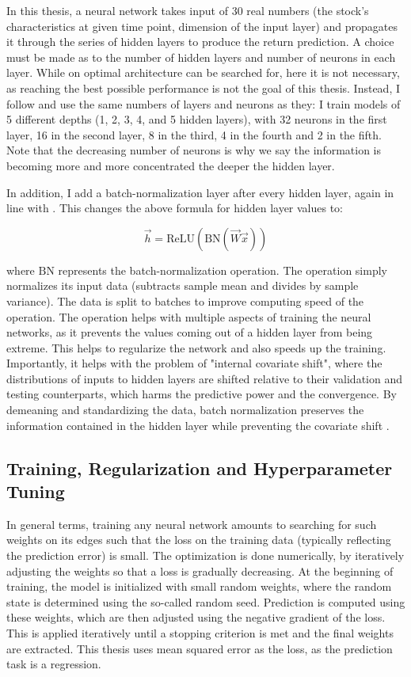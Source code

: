 	In this thesis, a neural network takes input of 30 real numbers (the stock's characteristics at given time point, dimension of the input layer) and propagates it through the series of hidden layers to produce the return prediction.	A choice must be made as to the number of hidden layers and number of neurons in each layer. While on optimal architecture can be searched for, here it is not necessary, as reaching the best possible performance is not the goal of this thesis. Instead, I follow \cite{gu2020empirical} and use the same numbers of layers and neurons as they: I train models of 5 different depths (1, 2, 3, 4, and 5 hidden layers), with 32 neurons in the first layer, 16 in the second layer, 8 in the third, 4 in the fourth and 2 in the fifth. Note that the decreasing number of neurons is why we say the information is becoming more and more concentrated the deeper the hidden layer.
	
	In addition, I add a batch-normalization layer \citep{ioffe2015batch} after every hidden layer, again in line with  \cite{gu2020empirical}. This changes the above formula for hidden layer values to: 
	
	\begin{equation}
		\vec{h} = \text{ReLU}(\text{BN}(\vec{W}\vec{x}))
	\end{equation}
	
	where $\text{BN}$ represents the batch-normalization operation. The operation simply normalizes its input data (subtracts sample mean and divides by sample variance). The data is split to batches to improve computing speed of the operation. The operation helps with multiple aspects of training the neural networks, as it prevents the values coming out of a hidden layer from being extreme. This helps to regularize the network and also speeds up the training. Importantly, it helps with the problem of "internal covariate shift", where the distributions of inputs to hidden layers are shifted relative to their validation and testing counterparts, which harms the predictive power and the convergence. By demeaning and standardizing the data, batch normalization preserves the information contained in the hidden layer while preventing the covariate shift \citep{ioffe2015batch}. 
	
	
	\subsection{Training, Regularization and Hyperparameter Tuning}
	
	In general terms, training any neural network amounts to searching for such weights on its edges such that the loss on the training data (typically reflecting the prediction error) is small. The optimization is done numerically, by iteratively adjusting the weights so that a loss is gradually decreasing. At the beginning of training, the model is initialized with small random weights, where the random state is determined using the so-called random seed. Prediction is computed using these weights, which are then adjusted using the negative gradient of the loss. This is applied iteratively until a stopping criterion is met and the final weights are extracted. This thesis uses mean squared error as the loss, as the prediction task is a regression.
	
